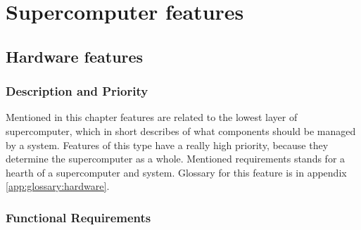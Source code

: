 \documentclass{report}
\begin{document}
\chapter{Supercomputer features}
\section{Hardware features}

\subsection{Description and Priority}

Mentioned in this chapter features are related to the lowest layer of supercomputer, which in short describes of what components should be managed by a system. Features of this type have a really high priority, because they determine the supercomputer as a whole. Mentioned requirements stands for a hearth of a supercomputer and system. Glossary for this feature is in appendix \ref{app:glossary:hardware}.


\subsection{Functional Requirements}
\end{document}

